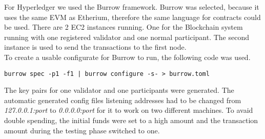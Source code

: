 For Hyperledger we used the Burrow framework. Burrow was selected, because it uses the same EVM as Etherium, 
therefore the same language for contracts could be used. There are 2 EC2 instances running. One for the Blockchain system
running with one registered validator and one normal participant. The second instance is used to send the
transactions to the first node. \\
To create a usable configurate for Burrow to run, the following code was used.
\begin{lstlisting}[frame=single]
    burrow spec -p1 -f1 | burrow configure -s- > burrow.toml
\end{lstlisting}
The key pairs for one validator and one participants were generated.
The automatic generated config files listening addresses had to be changed from \textit{127.0.0.1:port} to \textit{0.0.0.0:port}
for it to work on two different machines. To avaid double spending, the initial funds were set to a high amount and the transaction
amount during the testing phase switched to one.